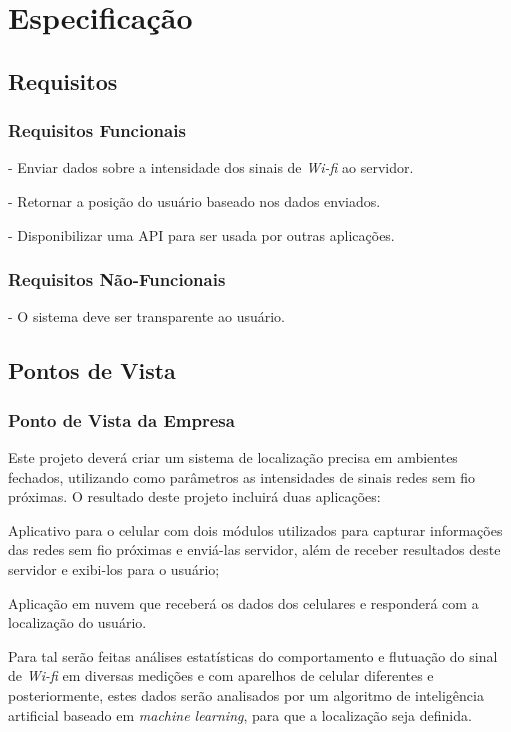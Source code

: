 
\chapter{Especificação}\label{chp:espec}
\section{Requisitos}\label{sec:req}

\subsection{Requisitos Funcionais}
- Enviar dados sobre a intensidade dos sinais de \textit{Wi-fi} ao servidor. \par
- Retornar a posição do usuário baseado nos dados enviados.\par
- Disponibilizar uma API para ser usada por outras aplicações.\par


\subsection{Requisitos Não-Funcionais}

- O sistema deve ser transparente ao usuário.\par

\section{Pontos de Vista}\label{sec:viewpoints}
\subsection{Ponto de Vista da Empresa}
Este projeto deverá criar um sistema de localização precisa em ambientes fechados, utilizando como parâmetros as intensidades de sinais redes sem fio próximas. O resultado deste projeto incluirá duas aplicações:\par
Aplicativo para o celular com dois módulos utilizados para capturar informações das redes sem fio próximas e enviá-las servidor, além de receber resultados deste servidor e exibi-los para o usuário;\par
Aplicação em nuvem que receberá os dados dos celulares e responderá com a localização do usuário.\par
Para tal serão feitas análises estatísticas do comportamento e flutuação do sinal de \textit{Wi-fi} em diversas medições e com aparelhos de celular diferentes e posteriormente, estes dados serão analisados por um algoritmo de inteligência artificial baseado em \textit{machine learning}, para que a localização seja definida.
